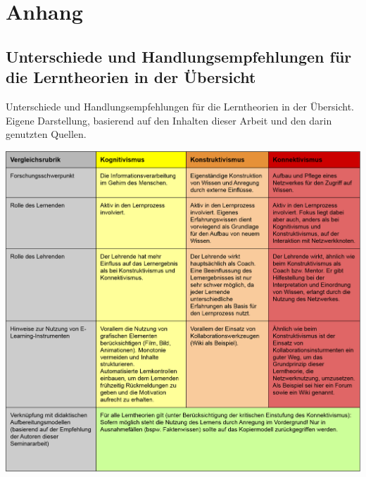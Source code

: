 \chapter{Anhang}
\newpage
\section{Unterschiede und Handlungsempfehlungen für die Lerntheorien in der Übersicht}
\begin{table}[h]
	\caption{Unterschiede und Handlungsempfehlungen für die Lerntheorien in der Übersicht. Eigene Darstellung, basierend auf den Inhalten dieser Arbeit und den darin genutzten Quellen.}
	\vspace{1em}
	\centering
	\includegraphics[width=1.0\textwidth]{Abbildungen/Gegenuberstellung.png}
	
	\label{fig:Unterschiede und Handlungsempfehlungen für die Lerntheorien}
\end{table}